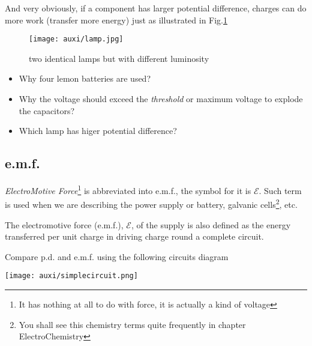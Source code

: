 \documentclass[a4paper]{tufte-handout}
\newenvironment{TaskBox} %
{\begin{tcolorbox}[breakable,colback=b1!30,colframe=b1,title=Task]} {\end{tcolorbox}}
\newenvironment{SummBox}
{\begin{tcolorbox}[breakable,colback=r1!30,colframe=r1,title=Summary]} {\end{tcolorbox}}
\begin{document}
And very obviously, if a component has larger potential difference, charges can do more work (transfer more energy) just as illustrated in Fig.\ref{fig:lamps}
\begin{figure}[h]
 \centering
 \texttt{[image: auxi/lamp.jpg]}
 \caption{two identical lamps but with different luminosity}
 \label{fig:lamps}
\end{figure}

\begin{TaskBox}
\begin{itemize}
  \item Why four lemon batteries are used?
  \item Why the voltage should exceed the \emph{threshold} or maximum voltage to explode the capacitors?
  \item Which lamp has higer potential difference?
\end{itemize}
\end{TaskBox}

\subsection{e.m.f.}
\emph{ElectroMotive Force}\footnote{It has nothing at all to do with force, it is actually a kind of voltage} is abbreviated into e.m.f., the symbol for it is $\mathcal{E}$. Such term is used when we are describing the power supply or battery, galvanic cells\footnote{You shall see this chemistry terms quite frequently in chapter ElectroChemistry}, etc.
\begin{SummBox}
The electromotive force (e.m.f.), $\mathcal{E}$, of the supply is also defined as the energy transferred per unit charge in driving charge round a complete circuit. 
\end{SummBox}

\begin{TaskBox}
Compare p.d. and e.m.f. using the following circuits diagram
\begin{center}
\texttt{[image: auxi/simplecircuit.png]}
\end{center}
\vspace{1in}
\end{TaskBox}
\end{document}
